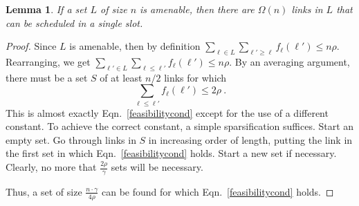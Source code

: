 \documentclass[11pt]{amsart}
\newcounter{foo}
\newtheorem{lemma}[foo]{Lemma}
\begin{document}
\begin{lemma}
If a set $L$ of size $n$ is amenable, then there are $\Omega(n)$ links in $L$ that can be scheduled in a single slot.
\label{lem:constantsizeapprox}
\end{lemma}
\begin{proof}
Since $L$ is amenable, then by definition $\sum_{\ell \in L} \sum_{\ell' \geq \ell} f_{\ell}(\ell') \leq n \rho$. Rearranging,
we get $\sum_{\ell' \in L} \sum_{\ell \leq \ell'}  f_{\ell}(\ell') \leq n \rho$. By an averaging argument, there
must be a set $S$ of at least $n/2$ links for which 
\begin{equation}
\sum_{\ell \leq \ell'}  f_{\ell}(\ell') \leq 2 \rho \ .
\end{equation}
This is almost exactly Eqn.~\ref{feasibilitycond} except for the use
of a different constant. To achieve the correct 
constant, a simple sparsification suffices. Start an empty set.
Go through links in $S$ in increasing order of length, putting the link in the first set in which Eqn.~\ref{feasibilitycond} holds.
Start a new set if necessary. Clearly, no more that $\frac{2 \rho}{\gamma}$ sets will be necessary.

Thus, a set of size $\frac{n \cdot \gamma}{4 \rho}$ can be found for which Eqn.~\ref{feasibilitycond} holds.
\end{proof}
\end{document}
